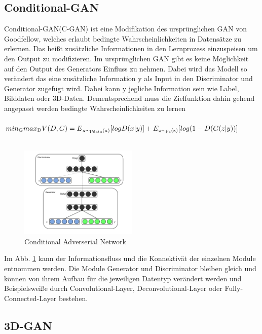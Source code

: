 \documentclass{llncs}
\begin{document}
\subsection{Conditional-GAN}\label{sec:cgan}

Conditional-GAN(C-GAN) ist eine Modifikation des ursprünglichen GAN von Goodfellow, welches erlaubt bedingte Wahrscheinlichkeiten in Datensätze zu erlernen. Das heißt zusätzliche Informationen in den Lernprozess einzuspeisen um den Output zu modifizieren. Im ursprünglichen GAN gibt es keine Möglichkeit auf den Output des Generators Einfluss zu nehmen. Dabei wird das Modell so verändert das eine zusätzliche Information y als Input in den Discriminator und Generator zugefügt wird. Dabei kann y jegliche Information sein wie Label, Bilddaten oder 3D-Daten. Dementsprechend muss die Zielfunktion dahin gehend angepasst werden bedingte Wahrscheinlichkeiten zu lernen
\\\\
\begin{math}
min\textsubscript{G} max\textsubscript{D}V(D,G)=E\textsubscript{x$\sim$p\textsubscript{data}(x)}[logD(x|y)]  + E\textsubscript{z$\sim$p\textsubscript{z}(z)}[log(1-D(G(z|y))]          
\end{math}
\\\\

\begin{figure}[htbp] 
	\centering
	\includegraphics[width=0.5\textwidth]{cgan.png}
	\caption{Conditional Adverserial Network\protect\cite{cgan}}
	\label{fig:Bild38}
\end{figure}
Im Abb. \ref{fig:Bild38} kann der Informationsfluss und die Konnektivät der einzelnen Module entnommen werden. Die Module Generator und Discriminator bleiben gleich und können von ihrem Aufbau für die jeweiligen Datentyp verändert werden und Beispielsweiße durch Convolutional-Layer, Deconvolutional-Layer oder Fully-Connected-Layer bestehen\cite{cgan}.
\newpage
\subsection{3D-GAN}\label{sec:3dgan}
\end{document}
